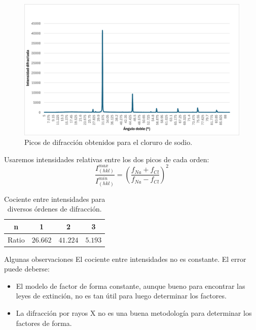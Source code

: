 \documentclass{beamer}
\begin{document}
\begin{frame}
    \begin{figure}[h!]
        \begin{center}
            \includegraphics[max width=\linewidth]{DifNaCl.png}
        \end{center}
        \caption{Picos de difracción obtenidos para el cloruro de sodio.}
    \end{figure}
\end{frame}
\begin{frame}
    Usaremos intensidades relativas entre los dos picos de cada orden:
    \begin{equation}
        \frac{I_{(hkl)}^{max}}{I_{(hkl)}^{min}} = \left(\frac{f_{Na} + f_{Cl}}{f_{Na} - f_{Cl}}\right)^2
    \end{equation}
    \begin{table}
        \begin{center}
            \begin{tabular}{|c|c|c|c|}
                \hline
                n & 1 & 2 & 3 \\ \hline
                Ratio & $26.662$ & $41.224$ & $5.193$ \\ \hline
            \end{tabular}
        \end{center}
        \caption{Cociente entre intensidades para diversos órdenes de difracción.}
    \end{table}
    \begin{block}{Algunas observaciones}
        El cociente entre intensidades no es constante. El error puede deberse:
        \begin{itemize}
            \item El modelo de factor de forma constante, aunque bueno para encontrar las leyes de extinción, no es tan útil para luego determinar los factores.
            \item La difracción por rayos X no es una buena metodología para determinar los factores de forma.
        \end{itemize}
    \end{block}
\end{frame}
\end{document}
